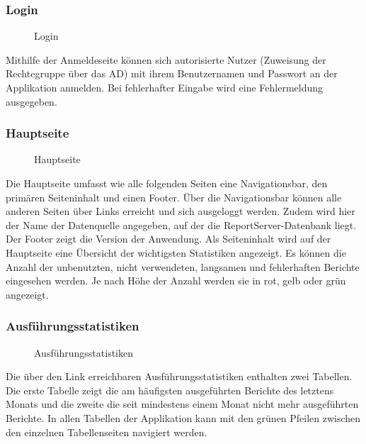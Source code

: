 \subsubsection{Login}
\label{app:Login}
\begin{figure}[htb]
    \centering
    \caption{Login}
    \label{fig:Login}
\end{figure}
Mithilfe der Anmeldeseite können sich autorisierte Nutzer (Zuweisung der Rechtegruppe über das \ac{AD}) mit ihrem Benutzernamen und Passwort an der Applikation anmelden. Bei fehlerhafter Eingabe wird eine Fehlermeldung ausgegeben.

\subsubsection{Hauptseite}
\label{app:Hauptseite}
\begin{figure}[htb]
    \centering
    \caption{Hauptseite}
    \label{fig:Hauptseite}
\end{figure}
Die Hauptseite umfasst wie alle folgenden Seiten eine Navigationsbar, den primären Seiteninhalt und einen Footer. Über die Navigationsbar können alle anderen Seiten über Links erreicht und sich ausgeloggt werden. Zudem wird hier der Name der Datenquelle angegeben, auf der die ReportServer-Datenbank liegt. Der Footer zeigt die Version der Anwendung. Als Seiteninhalt wird auf der Hauptseite eine Übersicht der wichtigsten Statistiken angezeigt. Es können die Anzahl der unbenutzten, nicht verwendeten, langsamen und fehlerhaften Berichte eingesehen werden. Je nach Höhe der Anzahl werden sie in rot, gelb oder grün angezeigt.

\subsubsection{Ausführungsstatistiken}
\label{app:Ausfuehrung}
\begin{figure}[htb]
    \centering
    \caption{Ausführungsstatistiken}
    \label{fig:Ausfuehrung}
\end{figure}
Die über den Link  erreichbaren Ausführungsstatistiken enthalten zwei Tabellen. Die erste Tabelle zeigt die am häufigsten ausgeführten Berichte des letztens Monats und die zweite die seit mindestens einem Monat nicht mehr ausgeführten Berichte. In allen Tabellen der Applikation kann mit den grünen Pfeilen zwischen den einzelnen Tabellenseiten navigiert werden.

